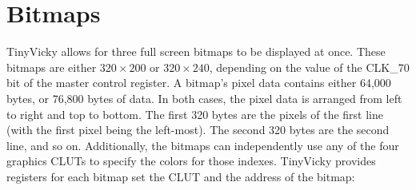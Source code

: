 \section*{Bitmaps}
\label{sec:bitmaps}

TinyVicky allows for three full screen bitmaps to be displayed at once. These bitmaps are either $320 \times 200$ or $320 \times 240$, depending on the value of the CLK\_70 bit of the master control register. A bitmap's pixel data contains either 64,000 bytes, or 76,800 bytes of data. In both cases, the pixel data is arranged from left to right and top to bottom. The first 320 bytes are the pixels of the first line (with the first pixel being the left-most). The second 320 bytes are the second line, and so on. Additionally, the bitmaps can independently use any of the four graphics CLUTs to specify the colors for those indexes. TinyVicky provides registers for each bitmap set the CLUT and the address of the bitmap:

